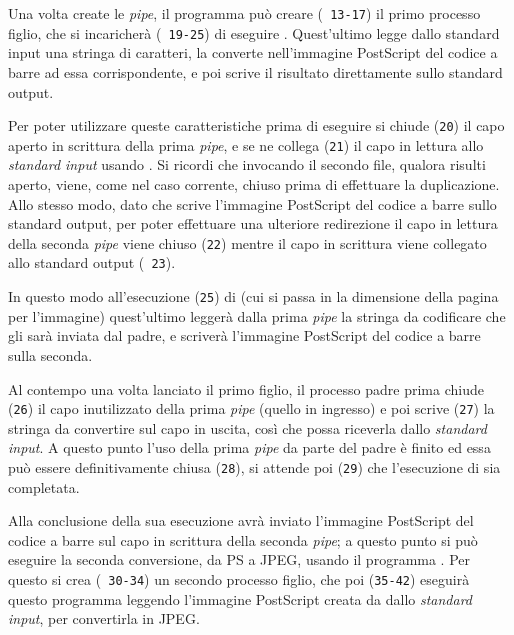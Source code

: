 Una volta create le \textit{pipe}, il programma può creare (\texttt{\small
  13-17}) il primo processo figlio, che si incaricherà (\texttt{\small
  19-25}) di eseguire . Quest'ultimo legge dallo standard input
una stringa di caratteri, la converte nell'immagine PostScript del codice a
barre ad essa corrispondente, e poi scrive il risultato direttamente sullo
standard output.

Per poter utilizzare queste caratteristiche prima di eseguire  si
chiude (\texttt{\small 20}) il capo aperto in scrittura della prima
\textit{pipe}, e se ne collega (\texttt{\small 21}) il capo in lettura allo
\textit{standard input} usando . Si ricordi che invocando
 il secondo file, qualora risulti aperto, viene, come nel caso
corrente, chiuso prima di effettuare la duplicazione. Allo stesso modo, dato
che  scrive l'immagine PostScript del codice a barre sullo
standard output, per poter effettuare una ulteriore redirezione il capo in
lettura della seconda \textit{pipe} viene chiuso (\texttt{\small 22}) mentre
il capo in scrittura viene collegato allo standard output (\texttt{\small
  23}).

In questo modo all'esecuzione (\texttt{\small 25}) di  (cui si
passa in  la dimensione della pagina per l'immagine) quest'ultimo
leggerà dalla prima \textit{pipe} la stringa da codificare che gli sarà
inviata dal padre, e scriverà l'immagine PostScript del codice a barre sulla
seconda.

Al contempo una volta lanciato il primo figlio, il processo padre prima chiude
(\texttt{\small 26}) il capo inutilizzato della prima \textit{pipe} (quello in
ingresso) e poi scrive (\texttt{\small 27}) la stringa da convertire sul capo
in uscita, così che  possa riceverla dallo \textit{standard
  input}. A questo punto l'uso della prima \textit{pipe} da parte del padre è
finito ed essa può essere definitivamente chiusa (\texttt{\small 28}), si
attende poi (\texttt{\small 29}) che l'esecuzione di  sia
completata.

Alla conclusione della sua esecuzione  avrà inviato l'immagine
PostScript del codice a barre sul capo in scrittura della seconda
\textit{pipe}; a questo punto si può eseguire la seconda conversione, da PS a
JPEG, usando il programma . Per questo si crea (\texttt{\small
  30-34}) un secondo processo figlio, che poi (\texttt{\small 35-42})
eseguirà questo programma leggendo l'immagine PostScript creata da
 dallo \textit{standard input}, per convertirla in JPEG.

